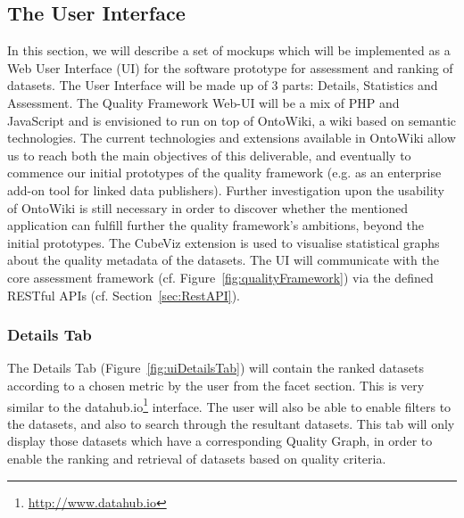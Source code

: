 
\subsection{The User Interface}
\label{sec:UI} 
In this section, we will describe a set of mockups which will be implemented as a Web User Interface (UI) for the software prototype for assessment and ranking of datasets.
The User Interface will be made up of 3 parts: Details, Statistics and Assessment.
The Quality Framework Web-UI will be a mix of PHP and JavaScript and is envisioned to run on top of OntoWiki, a wiki based on semantic technologies.
The current technologies and extensions available in OntoWiki allow us to reach both the main objectives of this deliverable, and eventually to commence our initial prototypes of the quality framework (e.g. as an enterprise add-on tool for linked data publishers).
Further investigation upon the usability of OntoWiki is still necessary in order to discover whether the mentioned application can fulfill further the quality framework's ambitions, beyond the initial prototypes.
The CubeViz extension is used to visualise statistical graphs about the quality metadata of the datasets.
The UI will communicate with the core assessment framework (cf. Figure~\ref{fig:qualityFramework}) via the defined RESTful APIs (cf. Section~\ref{sec:RestAPI}).

\subsubsection{Details Tab}
The Details Tab (Figure~\ref{fig:uiDetailsTab}) will contain the ranked datasets according to a chosen metric by the user from the facet section. 
This is very similar to the datahub.io\footnote{\url{http://www.datahub.io}} interface. 
The user will also be able to enable filters to the datasets, and also to search through the resultant datasets. 
This tab will only display those datasets which have a corresponding Quality Graph, in order to enable the ranking and retrieval of datasets based on quality criteria.

